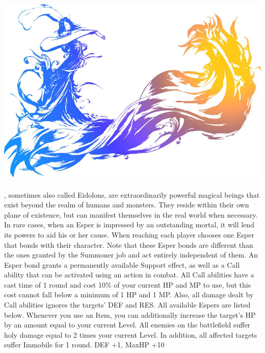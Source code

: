 %
\\\\
%
\includegraphics[width=\columnwidth]{./art/images/ff10.jpg}\\\\
%
, sometimes also called Eidolons, are extraordinarily powerful magical beings that exist beyond the realm of humans and monsters.
They reside within their own plane of existence, but can manifest themselves in the real world when necessary.
In rare cases, when an Esper is impressed by an outstanding mortal, it will lend its powers to aid his or her cause.
When reaching  each player chooses one Esper that bonds with their character.
Note that these Esper bonds are different than the ones granted by the Summoner job and act entirely independent of them.
An Esper bond grants a permanently available Support effect, as well as a Call ability that can be activated using an action in combat. 
All Call abilities have a cast time of 1 round and cost 10\% of your current HP and MP to use, but this cost cannot fall below a minimum of 1 HP and 1 MP.
Also, all damage dealt by Call abilities ignores the targets' DEF and RES.
All available Espers are listed below.
%
\vfill
%
{Whenever you use an Item, you can additionally increase the target's HP by an amount equal to your current Level.}
{All enemies on the battlefield suffer holy damage equal to 2 times your current Level. In addition, all affected targets suffer Immobile for 1 round.}
{DEF +1, MaxHP +10}
%
\vfill
%
